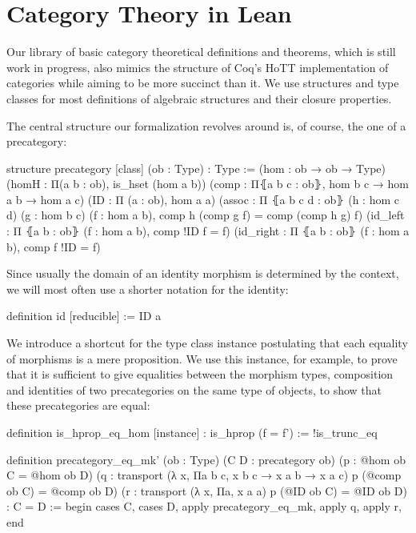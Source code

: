 \section{Category Theory in Lean} \label{section:categories-lean}

Our library of basic category theoretical definitions and theorems, which is
still work in progress, also mimics the structure of Coq's HoTT implementation
of categories while aiming to be more succinct than it.
We use structures and type classes for most definitions of algebraic structures
and their closure properties.

The central structure our formalization revolves around is, of course, the one
of a precategory:
\begin{leancode}
structure precategory [class] (ob : Type) : Type :=
  (hom : ob → ob → Type)
  (homH : Π(a b : ob), is_hset (hom a b))
  (comp : Π⦃a b c : ob⦄, hom b c → hom a b → hom a c)
  (ID : Π (a : ob), hom a a)
  (assoc : Π ⦃a b c d : ob⦄ (h : hom c d) (g : hom b c) (f : hom a b),
     comp h (comp g f) = comp (comp h g) f)
  (id_left : Π ⦃a b : ob⦄ (f : hom a b), comp !ID f = f)
  (id_right : Π ⦃a b : ob⦄ (f : hom a b), comp f !ID = f)
\end{leancode}

Since usually the domain of an identity morphism is determined by the context,
we will most often use a shorter notation for the identity:
\begin{leancode}
definition id [reducible] := ID a
\end{leancode}

We introduce a shortcut for the type class instance postulating that each equality
of morphisms is a mere proposition.
We use this instance, for example, to prove that it is sufficient to give equalities
between the morphism types, composition and identities of two precategories on the
same type of objects, to show that these precategories are equal:

\begin{leancode}
definition is_hprop_eq_hom [instance] : is_hprop (f = f') := !is_trunc_eq

definition precategory_eq_mk' (ob : Type) (C D : precategory ob)
  (p : @hom ob C = @hom ob D)
  (q : transport (λ x, Πa b c, x b c → x a b → x a c) p
    (@comp ob C) = @comp ob D)
  (r : transport (λ x, Πa, x a a) p (@ID ob C) = @ID ob D) : C = D :=
begin
  cases C, cases D,
  apply precategory_eq_mk, apply q, apply r,
end
\end{leancode}

